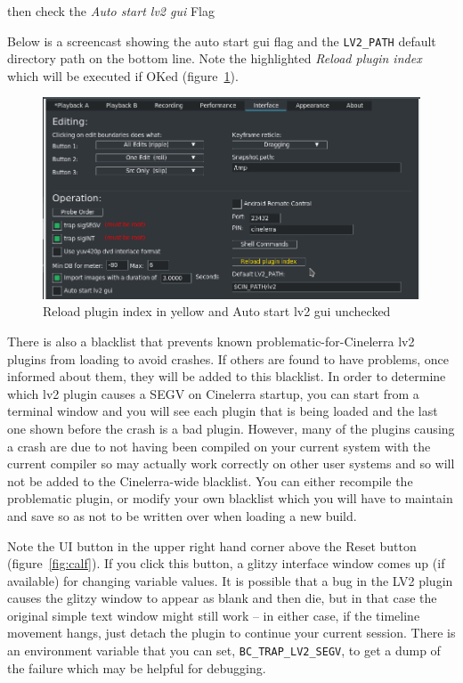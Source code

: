 then check the \textit{Auto start lv2 gui} Flag

Below is a screencast showing the auto start gui flag and the \texttt{LV2\_PATH} default directory path on the bottom line. Note the highlighted \textit{Reload plugin index} which will be executed if OKed (figure~\ref{fig:reload}).

\begin{figure}[htpb]
    \centering
    \includegraphics[width=0.9\linewidth]{images/reload.png}
    \caption{Reload plugin index in yellow and Auto start lv2 gui unchecked}
    \label{fig:reload}
\end{figure}

There is also a blacklist that prevents known problematic-for-Cinelerra lv2 plugins from loading to avoid crashes. If others are found to have problems, once informed about them, they will be added to this blacklist. In order to determine which lv2 plugin causes a SEGV on Cinelerra startup, you can start from a terminal window and you will see each plugin that is being loaded and the last one shown before the crash is a bad plugin. However, many of the plugins causing a crash are due to not having been compiled on your current system with the current compiler so may actually work correctly on other user systems and so will not be added to the Cinelerra-wide blacklist. You can either recompile the problematic plugin, or modify your own blacklist which you will have to maintain and save so as not to be written over when loading a new build.

Note the UI button in the upper right hand corner above the Reset button (figure~\ref{fig:calf}). If you click this button, a glitzy interface window comes up (if available) for changing variable values. It is possible that a bug in the LV2 plugin causes the glitzy window to appear as blank and then die, but in that case the original simple text window might still work -- in either case, if the timeline movement hangs, just detach the plugin to continue your current session. There is an environment variable that you can set,  \texttt{BC\_TRAP\_LV2\_SEGV}, to get a dump of the failure which may be helpful for debugging.


